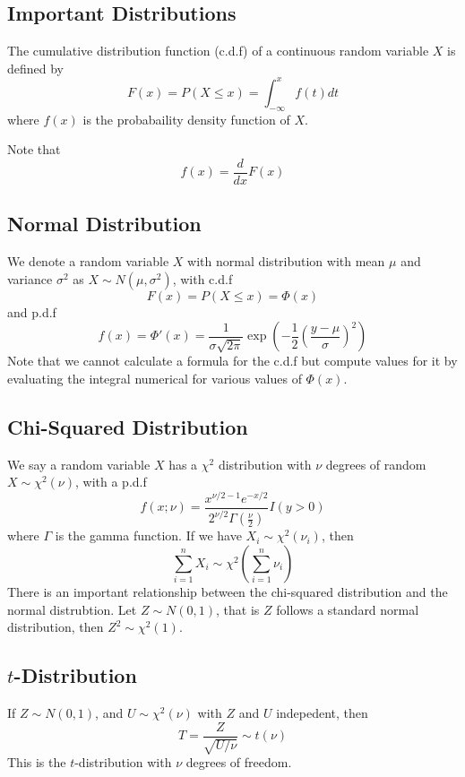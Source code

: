 \subsection{Important Distributions}

\begin{definition}
    The cumulative distribution function (c.d.f) of a continuous random variable $X$ is defined by 
    \[F(x) = P(X \leq x) = \int_{-\infty}^x f(t)dt\]
    where $f(x)$ is the probabaility density function of $X$. 
\end{definition}
Note that 
\[f(x) = \frac{d}{dx} F(x)\]
\subsection*{Normal Distribution}
We denote a random variable $X$ with normal distribution with mean $\mu$ and variance $\sigma^2$ as $X \sim N(\mu, \sigma^2)$, with c.d.f 
\[F(x) = P(X \leq x) = \Phi(x)\]
and p.d.f 
\[f(x) = \Phi'(x) = \frac{1}{\sigma\sqrt{2\pi}}\exp\left(-\frac{1}{2}\left(\frac{y-\mu}{\sigma}\right)^2\right)\]
Note that we cannot calculate a formula for the c.d.f but compute values for it by evaluating the integral numerical for various values of $\Phi(x)$. 
\subsection*{Chi-Squared Distribution}
We say a random variable $X$ has a $\chi^2$ distribution with $\nu$ degrees of random $X \sim \chi^2(\nu)$, with a p.d.f 
\[f(x; \nu) = \frac{x^{\nu/2 - 1}e^{-x/2}}{2^{\nu/2}\Gamma\left(\frac{\nu}{2}\right)}I(y > 0)\]
where $\Gamma$ is the gamma function. If we have $X_i \sim \chi^2(\nu_i)$, then 
\[\sum_{i=1}^n X_i \sim \chi^2\left(\sum_{i=1}^n \nu_i\right)\]
There is an important relationship between the chi-squared distribution and the normal distrubtion. Let $Z \sim N(0,1)$, that is $Z$ follows a standard normal distribution, then $Z^2 \sim \chi^2(1)$. 
\subsection*{$t$-Distribution}
If $Z \sim N(0,1)$, and $U \sim \chi^2(\nu)$ with $Z$ and $U$ indepedent, then 
\[T = \frac{Z}{\sqrt{U/\nu}} \sim t(\nu)\]
This is the $t$-distribution with $\nu$ degrees of freedom.
